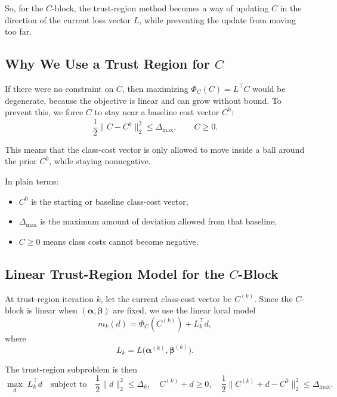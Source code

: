 \documentclass{article}
\begin{document}
So, for the $C$-block, the trust-region method becomes a way of updating $C$ in the direction of the current loss vector $L$, while preventing the update from moving too far.

\subsection{Why We Use a Trust Region for $C$}

If there were no constraint on $C$, then maximizing $\Phi_C(C) = L^\top C$ would be degenerate, because the objective is linear and can grow without bound. To prevent this, we force $C$ to stay near a baseline cost vector $C^0$:
\begin{equation}
 \frac{1}{2}\|C - C^0\|_2^2 \leq \Delta_{\max},
 \qquad C \geq 0.
\end{equation}

This means that the class-cost vector is only allowed to move inside a ball around the prior $C^0$, while staying nonnegative.

In plain terms:
\begin{itemize}
    \item $C^0$ is the starting or baseline class-cost vector,
    \item $\Delta_{\max}$ is the maximum amount of deviation allowed from that baseline,
    \item $C \geq 0$ means class costs cannot become negative.
\end{itemize}

\subsection{Linear Trust-Region Model for the $C$-Block}

At trust-region iteration $k$, let the current class-cost vector be $C^{(k)}$. Since the $C$-block is linear when $(\boldsymbol{\alpha},\boldsymbol{\beta})$ are fixed, we use the linear local model
\begin{equation}
 m_k(d) = \Phi_C(C^{(k)}) + L_k^\top d,
\end{equation}
where
\begin{equation}
 L_k = L\big(\boldsymbol{\alpha}^{(k)},\boldsymbol{\beta}^{(k)}\big).
\end{equation}

The trust-region subproblem is then
\begin{equation}
 \max_d \; L_k^\top d
 \quad \text{subject to} \quad
 \frac{1}{2}\|d\|_2^2 \leq \Delta_k,
 \quad C^{(k)} + d \geq 0,
 \quad \frac{1}{2}\|C^{(k)} + d - C^0\|_2^2 \leq \Delta_{\max}.
\end{equation}
\end{document}
